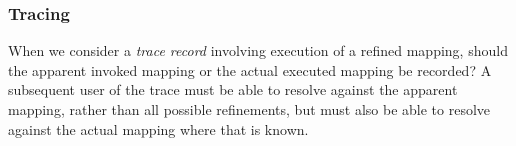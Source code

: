 \documentclass[runningheads,a4paper]{llncs}
\begin{document}





 

\subsubsection{Tracing}

When we consider a \emph{trace record} involving execution of  a refined mapping, should the apparent invoked mapping or the actual executed mapping be recorded? A subsequent user of the trace must be able to resolve against the apparent mapping, rather than all possible refinements, but must also be able to resolve against the actual mapping where that is known. 
\end{document}
